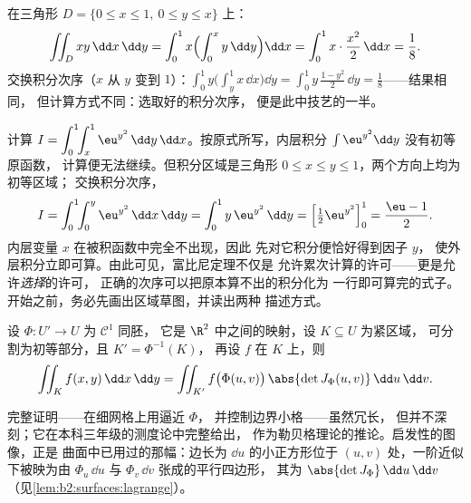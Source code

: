 \begin{example}\label{ex:b2:multint:triangle}
在三角形 $D = \{0 \leq x \leq 1,\ 0 \leq y \leq x\}$ 上：
\[
\iint_D xy \,\dd x\,\dd y
= \int_0^1 x\Bigl(\int_0^x y\,\dd y\Bigr)\dd x
= \int_0^1 x\cdot\frac{x^2}{2}\,\dd x = \frac18 .
\]
交换积分次序（$x$ 从 $y$ 变到 $1$）：$\int_0^1
y\bigl(\int_y^1 x\,\dd x\bigr)\dd y = \int_0^1
y\,\frac{1 - y^2}{2}\,\dd y = \frac18$——结果相同，
但计算方式不同：选取好的积分次序，
便是此中技艺的一半。
\end{example}

\begin{example}[只有一种次序可行]\label{ex:b2:multint:swaporder}
计算 $I = \displaystyle\int_0^1\!\!\int_x^1
\eu^{y^2}\,\dd y\,\dd x$。按原式所写，内层积分
$\int\eu^{y^2}\dd y$ 没有初等原函数，
计算便无法继续。但积分区域是三角形 $0 \leq
x \leq y \leq 1$，两个方向上均为初等区域；
交换积分次序，
\[
I = \int_0^1\!\!\int_0^y \eu^{y^2}\,\dd x\,\dd y
= \int_0^1 y\,\eu^{y^2}\,\dd y
= \Bigl[\tfrac12\eu^{y^2}\Bigr]_0^1 = \frac{\eu - 1}{2} .
\]
内层变量 $x$ 在被积函数中完全不出现，因此
先对它积分便恰好得到因子 $y$，
使外层积分立即可算。由此可见，富比尼定理不仅是
允许累次计算的许可——更是允许\emph{选择}的许可，
正确的次序可以把原本算不出的积分化为
一行即可算完的式子。开始之前，务必先画出区域草图，并读出两种
描述方式。
\end{example}

\begin{theorem}[变量替换]\label{thm:b2:multint:changevar}
设 $\Phi \colon U' \to U$ 为 $\mathcal{C}^1$ 同胚，
它是 $\R^2$ 中之间的映射，设 $K \subseteq U$ 为紧区域，
可分割为初等部分，且 $K' = \Phi^{-1}(K)$，
再设 $f$ 在 $K$ 上，则
\[
\iint_K f(x, y)\,\dd x\,\dd y
= \iint_{K'} f\bigl(\Phi(u, v)\bigr)\,
\abs{\det J_\Phi(u, v)}\,\dd u\,\dd v .
\]
\end{theorem}
\admitted

\begin{remark}
完整证明——在细网格上用逼近 $\Phi$，
并控制边界小格——虽然冗长，
但并不深刻；它在本科三年级的测度论中完整给出，
作为勒贝格理论的推论。启发性的图像，正是
曲面中已用过的那幅：边长为 $\dd u$ 的小正方形位于
$(u, v)$ 处，一阶近似下被映为由 $\Phi_u\,\dd u$ 与 $\Phi_v\,\dd v$ 张成的平行四边形，
其为
$\abs{\det J_\Phi}\,\dd u\,\dd v$
（见\cref{lem:b2:surfaces:lagrange}）。
\end{remark}

